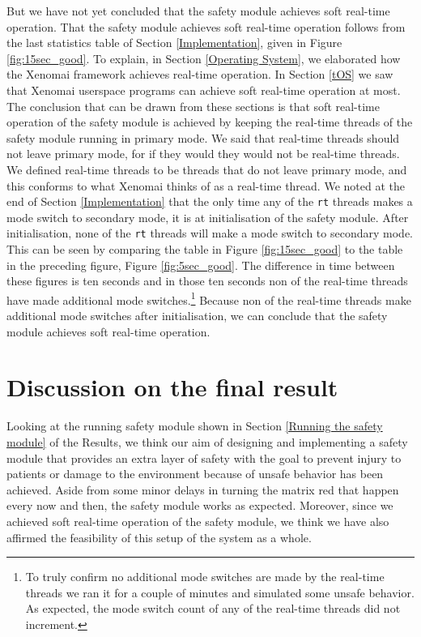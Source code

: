 \documentclass[12pt]{scrreprt}
\begin{document}
But we have not yet concluded that the safety module achieves soft real-time operation. That the safety module achieves soft real-time operation follows from the last statistics table of Section \ref{Implementation}, given in Figure \ref{fig:15sec_good}. To explain, in Section \ref{Operating System}, we elaborated how the Xenomai framework achieves real-time operation. In Section \ref{tOS} we saw that Xenomai userspace programs can achieve soft real-time operation at most. The conclusion that can be drawn from these sections is that soft real-time operation of the safety module is achieved by keeping the real-time threads of the safety module running in primary mode. We said that real-time threads should not leave primary mode, for if they would they would not be real-time threads. We defined real-time threads to be threads that do not leave primary mode, and this conforms to what Xenomai thinks of as a real-time thread. We noted at the end of Section \ref{Implementation} that the only time any of the \texttt{rt} threads makes a mode switch to secondary mode, it is at initialisation of the safety module. After initialisation, none of the \texttt{rt} threads will make a mode switch to secondary mode. This can be seen by comparing the table in Figure \ref{fig:15sec_good} to the table in the preceding figure, Figure \ref{fig:5sec_good}. The difference in time between these figures is ten seconds and in those ten seconds non of the real-time threads have made additional mode switches.\footnote{To truly confirm no additional mode switches are made by the real-time threads we ran it for a couple of minutes and simulated some unsafe behavior. As expected, the mode switch count of any of the real-time threads did not increment.} Because non of the real-time threads make additional mode switches after initialisation, we can conclude that the safety module achieves soft real-time operation.

\section{Discussion on the final result}
Looking at the running safety module shown in Section \ref{Running the safety module} of the Results, we think our aim of designing and implementing a safety module that provides an extra layer of safety with the goal to prevent injury to patients or damage to the environment because of unsafe behavior has been achieved. Aside from some minor delays in turning the matrix red that happen every now and then, the safety module works as expected. Moreover, since we achieved soft real-time operation of the safety module, we think we have also affirmed the feasibility of this setup of the system as a whole.
\end{document}
